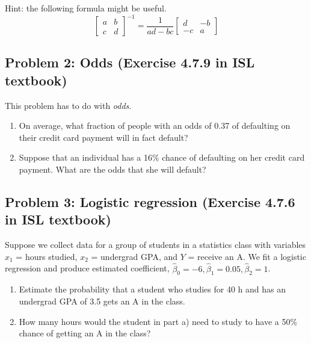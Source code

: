\documentclass[]{article}
\providecommand{\tightlist}{%
  \setlength{\itemsep}{0pt}\setlength{\parskip}{0pt}}
\begin{document}
Hint: the following formula might be useful. \[\left[
\begin{array}{cc} a & b \\ c & d \end{array} 
\right]^{-1} = \frac{1}{ad-bc}
\left[
\begin{array}{cc} d & -b \\ -c & a \end{array} 
\right]\]

\subsection{Problem 2: Odds (Exercise 4.7.9 in ISL
textbook)}\label{problem-2-odds-exercise-4.7.9-in-isl-textbook}

This problem has to do with \emph{odds}.

\begin{enumerate}
\def\labelenumi{\alph{enumi}.}
\tightlist
\item
  On average, what fraction of people with an odds of 0.37 of defaulting
  on their credit card payment will in fact default?\\
\item
  Suppose that an individual has a 16\% chance of defaulting on her
  credit card payment. What are the odds that she will default?
\end{enumerate}

\subsection{Problem 3: Logistic regression (Exercise 4.7.6 in ISL
textbook)}\label{problem-3-logistic-regression-exercise-4.7.6-in-isl-textbook}

Suppose we collect data for a group of students in a statistics class
with variables \(x_1\) = hours studied, \(x_2\) = undergrad GPA, and
\(Y\) = receive an A. We fit a logistic regression and produce estimated
coefficient,
\(\hat{\beta}_0 = -6, \hat{\beta}_1 = 0.05, \hat{\beta}_2 = 1\).

\begin{enumerate}
\def\labelenumi{\alph{enumi}.}
\tightlist
\item
  Estimate the probability that a student who studies for 40 h and has
  an undergrad GPA of 3.5 gets an A in the class.\\
\item
  How many hours would the student in part a) need to study to have a
  50\% chance of getting an A in the class?
\end{enumerate}
\end{document}
